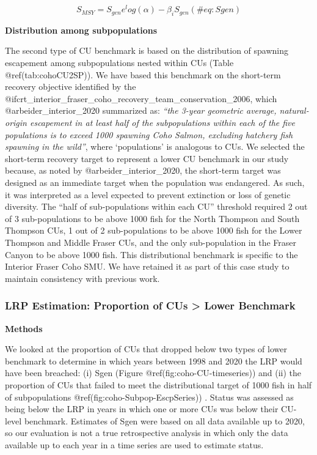 \documentclass[
]{article}
\begin{document}
\begin{equation}
  S_{MSY} = S_{gen}e^log(\alpha)-\beta_iS_{gen}
  (\#eq:Sgen)
\end{equation}

\textbf{Distribution among subpopulations}

The second type of CU benchmark is based on the distribution of spawning
escapement among subpopulations nested within CUs (Table
@ref(tab:cohoCU2SP)). We have based this benchmark on the short-term
recovery objective identified by the
@ifcrt\_interior\_fraser\_coho\_recovery\_team\_conservation\_2006,
which @arbeider\_interior\_2020 summarized as: \emph{``the 3-year
geometric average, natural-origin escapement in at least half of the
subpopulations within each of the five populations is to exceed 1000
spawning Coho Salmon, excluding hatchery fish spawning in the wild''},
where `populations' is analogous to CUs. We selected the short-term
recovery target to represent a lower CU benchmark in our study because,
as noted by @arbeider\_interior\_2020, the short-term target was
designed as an immediate target when the population was endangered. As
such, it was interpreted as a level expected to prevent extinction or
loss of genetic diversity. The ``half of sub-populations within each
CU'' threshold required 2 out of 3 sub-populations to be above 1000 fish
for the North Thompson and South Thompson CUs, 1 out of 2
sub-populations to be above 1000 fish for the Lower Thompson and Middle
Fraser CUs, and the only sub-population in the Fraser Canyon to be above
1000 fish. This distributional benchmark is specific to the Interior
Fraser Coho SMU. We have retained it as part of this case study to
maintain consistency with previous work.

\hypertarget{lrp-estimation-proportion-of-cus-lower-benchmark}{%
\subsubsection{LRP Estimation: Proportion of CUs \textgreater{} Lower
Benchmark}\label{lrp-estimation-proportion-of-cus-lower-benchmark}}

\textbf{Methods}

We looked at the proportion of CUs that dropped below two types of lower
benchmark to determine in which years between 1998 and 2020 the LRP
would have been breached: (i) Sgen (Figure @ref(fig:coho-CU-timeseries))
and (ii) the proportion of CUs that failed to meet the distributional
target of 1000 fish in half of subpopulations
@ref(fig:coho-Subpop-EscpSeries)) . Status was assessed as being below
the LRP in years in which one or more CUs was below their CU-level
benchmark. Estimates of Sgen were based on all data available up to
2020, so our evaluation is not a true retrospective analysis in which
only the data available up to each year in a time series are used to
estimate status.
\end{document}
